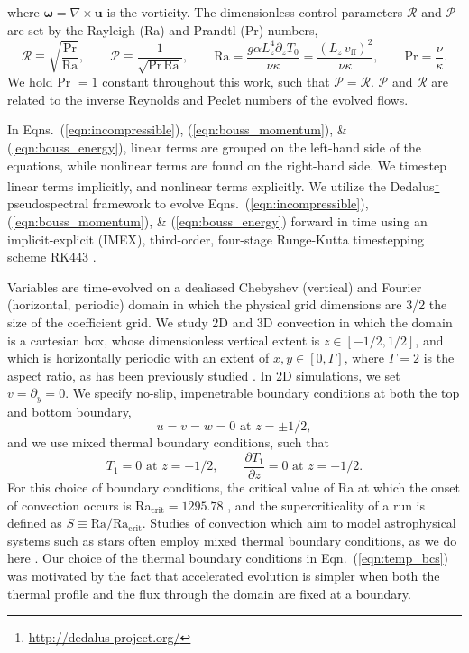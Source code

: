 \documentclass[aps, pre, onecolumn, nofootinbib, notitlepage, groupedaddress, amsfonts, amssymb, amsmath, longbibliography]{revtex4-1}
\newcommand{\grad}{\ensuremath{\nabla}}
\begin{document}
where $\bm{\omega} = \grad \times \bm{u}$ is the vorticity.
The dimensionless control parameters $\mathcal{R}$ and $\mathcal{P}$ 
are set by the Rayleigh (Ra) and Prandtl (Pr) numbers,
\begin{equation}
\mathcal{R} \equiv \sqrt{\frac{\text{Pr}}{\text{Ra}}}, \qquad \mathcal{P} \equiv \frac{1}{\sqrt{\text{Pr}\,\text{Ra}}}, \qquad
\text{Ra} = \frac{g \alpha L_z^4 \partial_z T_0}{\nu\kappa} = \frac{(L_z\,v_{\text{ff}})^2}{\nu\kappa}, \qquad \text{Pr} = \frac{\nu}{\kappa}.
\end{equation}
We hold Pr $= 1$ constant throughout this work, such that $\mathcal{P} = \mathcal{R}$.
$\mathcal{P}$ and $\mathcal{R}$ are related to the inverse Reynolds and Peclet numbers of the
evolved flows.

In Eqns.~(\ref{eqn:incompressible}), (\ref{eqn:bouss_momentum}), \& (\ref{eqn:bouss_energy}),
linear terms are grouped on the left-hand side of the equations, while nonlinear terms
are found on the right-hand side. We timestep linear terms implicitly, and nonlinear
terms explicitly.
We utilize the 
Dedalus\footnote{\url{http://dedalus-project.org/}} 
pseudospectral framework \cite{burns&all2016} to evolve  
Eqns.~(\ref{eqn:incompressible}), (\ref{eqn:bouss_momentum}), \& (\ref{eqn:bouss_energy}) 
forward in time
using an implicit-explicit (IMEX), third-order, four-stage 
Runge-Kutta timestepping scheme RK443 \cite{ascher&all1997}.  

Variables are time-evolved on a dealiased Chebyshev (vertical)
and Fourier (horizontal, periodic) domain in which the
physical grid dimensions are 3/2 the size of the coefficient grid.  
We study 2D and 3D convection in which the domain is a cartesian box, 
whose dimensionless vertical extent is $z \in [-1/2, 1/2]$, 
and which is horizontally periodic with an extent of $x, y \in [0, \Gamma]$,
where $\Gamma = 2$ is the aspect ratio, as has been previously studied
\cite{goluskin&all2014, johnston&doering2009}. 
In 2D simulations, we set $v = \partial_y = 0$.
We specify no-slip, impenetrable boundary conditions at both the top and
bottom boundary,
\begin{equation}
u = v = w = 0 \, \, \text{at}\,\,z = \pm 1/2,
\label{eqn:vel_bcs}
\end{equation}
and we use mixed thermal boundary conditions, such that
\begin{equation}
T_1 = 0 \,\,\text{at}\,\, z=+1/2, \qquad
\frac{\partial T_1}{\partial z} = 0\,\,\text{at}\,\,z=-1/2.
\label{eqn:temp_bcs}
\end{equation}
For this choice of boundary conditions, the critical value of Ra at which
the onset of convection occurs is Ra$_{\text{crit}} = 1295.78$ \cite{goluskin2016}, and the
supercriticality of a run is defined as $S \equiv \text{Ra}/\text{Ra}_{\text{crit}}$.
Studies of convection which aim to model
astrophysical systems such as stars often employ mixed thermal
boundary conditions, as we do here \cite{hurlburt&all1984, cattaneo&all1991, korre&all2017}.
Our choice of the thermal boundary conditions in Eqn.~(\ref{eqn:temp_bcs}) 
was motivated by the fact that accelerated evolution is simpler when both the
thermal profile and the flux through the domain are fixed at a boundary.
\end{document}
